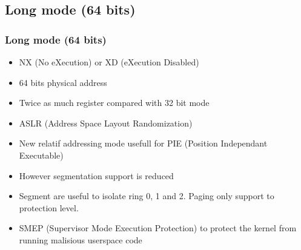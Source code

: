 \subsection{Long mode (64 bits)}
        \begin{frame}
        \frametitle{Long mode (64 bits)}
        \begin{itemize}
                \item NX (No eXecution) or XD (eXecution Disabled)
                \item 64 bits physical address
                \item Twice as much register compared with 32 bit mode
                \item ASLR (Address Space Layout Randomization)
                \item New relatif addressing mode usefull for PIE
                (Position Independant Executable)
                \item However segmentation support is reduced
                \item Segment are useful to isolate ring 0, 1 and 2.
                Paging only support to protection level.
                \item SMEP (Supervisor Mode Execution Protection) to
                protect the kernel from running malisious userspace code
        \end{itemize}
        \end{frame}

